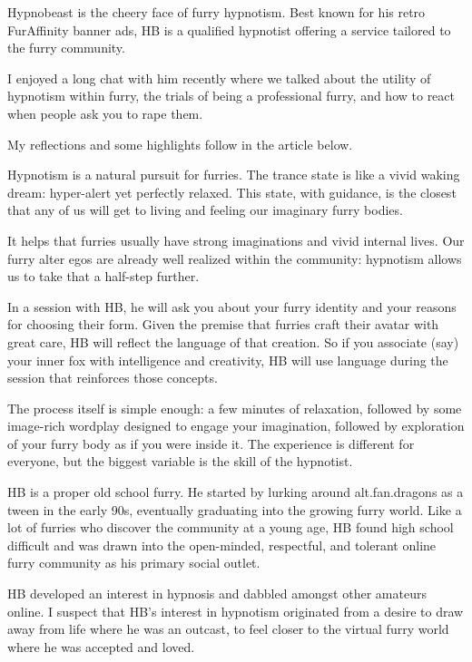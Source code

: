 
Hypnobeast is the cheery face of furry hypnotism. Best known for his retro FurAffinity banner ads, HB is a qualified hypnotist offering a service tailored to the furry community.

I enjoyed a long chat with him recently where we talked about the utility of hypnotism within furry, the trials of being a professional furry, and how to react when people ask you to rape them.

My reflections and some highlights follow in the article below.

Hypnotism is a natural pursuit for furries. The trance state is like a vivid waking dream: hyper-alert yet perfectly relaxed. This state, with guidance, is the closest that any of us will get to living and feeling our imaginary furry bodies.

It helps that furries usually have strong imaginations and vivid internal lives. Our furry alter egos are already well realized within the community: hypnotism allows us to take that a half-step further.

In a session with HB, he will ask you about your furry identity and your reasons for choosing their form. Given the premise that furries craft their avatar with great care, HB will reflect the language of that creation. So if you associate (say) your inner fox with intelligence and creativity, HB will use language during the session that reinforces those concepts.

The process itself is simple enough: a few minutes of relaxation, followed by some image-rich wordplay designed to engage your imagination, followed by exploration of your furry body as if you were inside it. The experience is different for everyone, but the biggest variable is the skill of the hypnotist.

HB is a proper old school furry. He started by lurking around alt.fan.dragons as a tween in the early 90s, eventually graduating into the growing furry world. Like a lot of furries who discover the community at a young age, HB found high school difficult and was drawn into the open-minded, respectful, and tolerant online furry community as his primary social outlet.

HB developed an interest in hypnosis and dabbled amongst other amateurs online. I suspect that HB's interest in hypnotism originated from a desire to draw away from life where he was an outcast, to feel closer to the virtual furry world where he was accepted and loved.

